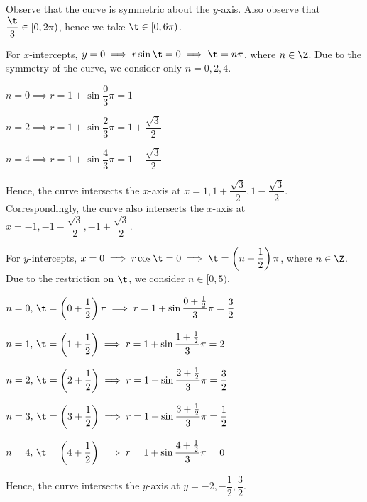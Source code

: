 \documentclass{echw}
\begin{document}
    \solution
        Observe that the curve is symmetric about the $y$-axis. Also observe that $\dfrac\t3 \in [0, 2\pi)$, hence we take $\t \in [0, 6\pi)$.
        
        For $x$-intercepts, $y = 0 \implies r\sin\t = 0 \implies \t = n\pi$, where $n \in \Z$. Due to the symmetry of the curve, we consider only $n = 0, 2, 4$.

         $n = 0 \implies r = 1 + \sin\dfrac03\pi = 1$
        
        \medskip

         $n = 2 \implies r = 1 + \sin\dfrac23\pi = 1 + \dfrac{\sqrt3}2$
        
        \medskip
        
         $n = 4 \implies r = 1 + \sin\dfrac43\pi = 1 - \dfrac{\sqrt3}2$

        Hence, the curve intersects the $x$-axis at $x = 1, 1 + \dfrac{\sqrt3}2, 1 - \dfrac{\sqrt3}2$. Correspondingly, the curve also intersects the $x$-axis at $x = -1, -1 - \dfrac{\sqrt3}2, -1 + \dfrac{\sqrt3}2$. 

        For $y$-intercepts, $x = 0 \implies r\cos\t = 0 \implies \t = \left(n + \dfrac12\right)\pi$, where $n \in \Z$. Due to the restriction on $\t$, we consider $n \in [0, 5)$.

         $n = 0, \, \t=\left(0 + \dfrac12\right)\pi \implies r = 1 + \sin\dfrac{0 + \frac12}3\pi = \dfrac32$

        \medskip

         $n = 1, \, \t=\left(1 + \dfrac12\right)\implies r = 1 + \sin\dfrac{1 + \frac12}3\pi = 2$

        \medskip

         $n = 2, \, \t=\left(2 + \dfrac12\right)\implies r = 1 + \sin\dfrac{2 + \frac12}3\pi = \dfrac32$

        \medskip

         $n = 3, \, \t=\left(3 + \dfrac12\right)\implies r = 1 + \sin\dfrac{3 + \frac12}3\pi = \dfrac12$

        \medskip

         $n = 4, \, \t=\left(4 + \dfrac12\right)\implies r = 1 + \sin\dfrac{4 + \frac12}3\pi = 0$

        Hence, the curve intersects the $y$-axis at $y = -2, -\dfrac12, \dfrac32$.
        
\end{document}
